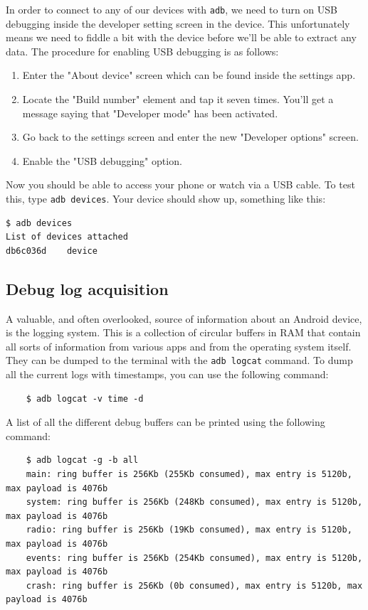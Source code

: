 \documentclass[a4paper,11pt,dvips]{article}
\begin{document}
In order to connect to any of our devices with \texttt{adb}, we need to turn on USB debugging inside the developer setting screen in the device. This unfortunately means we need to fiddle a bit with the device before we'll be able to extract any data. The procedure for enabling USB debugging is as follows:

\begin{enumerate}
\item Enter the "About device" screen which can be found inside the settings app.
\item Locate the "Build number" element and tap it seven times. You'll get a message saying that "Developer mode" has been activated.
\item Go back to the settings screen and enter the new "Developer options" screen.
\item Enable the "USB debugging" option.
\end{enumerate}

\noindent
Now you should be able to access your phone or watch via a USB cable. To test this, type \texttt{adb devices}. Your device should show up, something like this:

\scriptsize
\begin{verbatim}
$ adb devices
List of devices attached
db6c036d	device
\end{verbatim}
\normalsize


\subsection{Debug log acquisition}

A valuable, and often overlooked, source of information about an Android device, is the logging system. This is a collection of circular buffers in RAM that contain all sorts of information from various apps and from the operating system itself. They can be dumped to the terminal with the \texttt{adb logcat} command. To dump all the current logs with timestamps, you can use the following command:

\scriptsize
\begin{verbatim}
    $ adb logcat -v time -d
\end{verbatim}
\normalsize

\noindent
A list of all the different debug buffers can be printed using the following command:

\scriptsize
\begin{verbatim}
    $ adb logcat -g -b all
    main: ring buffer is 256Kb (255Kb consumed), max entry is 5120b, max payload is 4076b
    system: ring buffer is 256Kb (248Kb consumed), max entry is 5120b, max payload is 4076b
    radio: ring buffer is 256Kb (19Kb consumed), max entry is 5120b, max payload is 4076b
    events: ring buffer is 256Kb (254Kb consumed), max entry is 5120b, max payload is 4076b
    crash: ring buffer is 256Kb (0b consumed), max entry is 5120b, max payload is 4076b
\end{verbatim}
\normalsize
\end{document}
